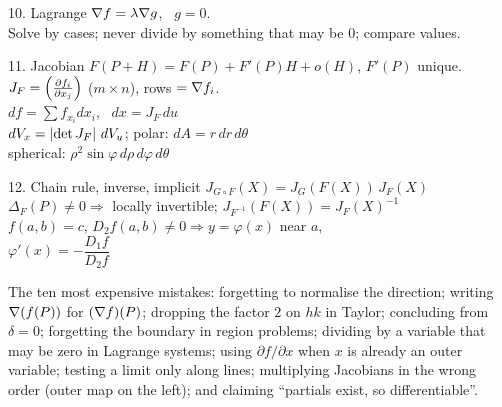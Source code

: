 \begin{tcbraster}[raster columns=2, raster equal height=rows, raster column skip=4mm, raster row skip=4mm]
\begin{fsheet}{10. Lagrange}
$\nabla f=\lambda\nabla g$, \ $g=0$.\\
Solve by cases; never divide by something that may be $0$; compare values.
\end{fsheet}
\begin{fsheet}{11. Jacobian}
$F(P+H)=F(P)+F'(P)H+o(H)$, $F'(P)$ unique.\\
$J_F=\left(\frac{\partial f_i}{\partial x_j}\right)$ ($m\times n$), rows $=\nabla f_i$.\\
$df=\sum f_{x_i}dx_i$, \ $dx=J_F\,du$\\
$dV_x=\left\lvert \det J_F\right\rvert\,dV_u$; polar: $dA=r\,dr\,d\theta$\\
spherical: $\rho^2\sin\varphi\,d\rho\,d\varphi\,d\theta$
\end{fsheet}
\begin{fsheet}{12. Chain rule, inverse, implicit}
$J_{G\circ F}(X)=J_G(F(X))\,J_F(X)$\\
$\Delta_F(P)\neq0\Rightarrow$ locally invertible; $J_{F^{-1}}(F(X))=J_F(X)^{-1}$\\
$f(a,b)=c$, $D_2f(a,b)\neq0\Rightarrow y=\varphi(x)$ near $a$,\\
$\varphi'(x)=-\dfrac{D_1f}{D_2f}$
\end{fsheet}
\end{tcbraster}

\begin{trap}
The ten most expensive mistakes: forgetting to normalise the direction; writing
$\nabla(f(P))$ for $(\nabla f)(P)$; dropping the factor $2$ on $hk$ in Taylor; concluding from
$\delta=0$; forgetting the boundary in region problems; dividing by a variable that may be zero in
Lagrange systems; using $\partial f/\partial x$ when $x$ is already an outer variable; testing a limit
only along lines; multiplying Jacobians in the wrong order (outer map on the left); and claiming
``partials exist, so differentiable''.
\end{trap}
